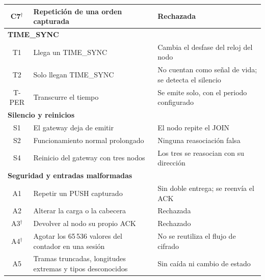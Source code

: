 {\begin{longtable}{|c|p{6.4cm}|p{6.8cm}|}
\hline
C7$^{\dagger}$ & Repetición de una orden capturada & Rechazada \\
\hline
\multicolumn{3}{|l|}{\textbf{TIME\_SYNC}} \\
\hline
T1 & Llega un TIME\_SYNC & Cambia el desfase del reloj del nodo \\
\hline
T2 & Solo llegan TIME\_SYNC & No cuentan como señal de vida; se detecta el silencio \\
\hline
T-PER & Transcurre el tiempo & Se emite solo, con el periodo configurado \\
\hline
\multicolumn{3}{|l|}{\textbf{Silencio y reinicios}} \\
\hline
S1 & El gateway deja de emitir & El nodo repite el JOIN \\
\hline
S2 & Funcionamiento normal prolongado & Ninguna reasociación falsa \\
\hline
S4 & Reinicio del gateway con tres nodos & Los tres se reasocian con su dirección \\
\hline
\multicolumn{3}{|l|}{\textbf{Seguridad y entradas malformadas}} \\
\hline
A1 & Repetir un PUSH capturado & Sin doble entrega; se reenvía el ACK \\
\hline
A2 & Alterar la carga o la cabecera & Rechazada \\
\hline
A3$^{\dagger}$ & Devolver al nodo su propio ACK & Rechazado \\
\hline
A4$^{\dagger}$ & Agotar los 65\,536 valores del contador en una sesión & No se reutiliza el flujo de cifrado \\
\hline
A5 & Tramas truncadas, longitudes extremas y tipos desconocidos & Sin caída ni cambio de estado \\
\hline
\end{longtable}
}

